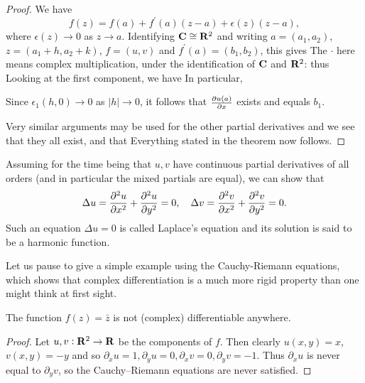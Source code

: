 \begin{proof}
We have
\[f(z)=f(a)+f^\prime(a)(z-a)+\epsilon(z)(z-a),\]
where $\epsilon(z)\to0$ as $z\to a$. Identifying $\mathbf C\cong\mathbf R^2$ and writing $a=(a_1,a_2)$, $z=(a_1+h,a_2+k)$, $f=(u,v)$ and $f^\prime(a)=(b_1,b_2)$, this gives
The $\cdot$ here means complex multiplication, under the identification of $\mathbf C$ and $\mathbf R^2$: thus
Looking at the first component, we have
In particular,

Since $\epsilon_1(h,0)\to0$ as $|h|\to0$, it follows that $\pdv{u(a)}{x}$ exists and equals $b_1$.

Very similar arguments may be used for the other partial derivatives and we see that they all exist, and that
Everything stated in the theorem now follows. 
\end{proof}

Assuming for the time being that $u,v$ have continuous partial derivatives of all orders (and in particular the mixed partials are equal), we can show that
\[\Delta u=\pdv[2]{u}{x}+\pdv[2]{u}{y}=0,\quad\Delta v=\pdv[2]{v}{x}+\pdv[2]{v}{y}=0.\]
Such an equation $\Delta u=0$ is called Laplace's equation and its solution is said to be a harmonic function.

Let us pause to give a simple example using the Cauchy-Riemann equations, which shows that complex differentiation is a much more rigid property than one might think at first sight.

\begin{example}
The function $f(z)=\bar{z}$ is not (complex) differentiable anywhere.
\end{example}

\begin{proof}
Let $u,v:\mathbf R^2\to\mathbf R$ be the components of $f$. Then clearly $u(x,y) = x$, $v(x,y)=-y$ and so $\partial_x u=1,\partial_y u=0, \partial_x v=0, \partial_y v=-1$. Thus $\partial_xu$ is never equal to $\partial_yv$, so the Cauchy--Riemann equations are never satisfied.
\end{proof}

